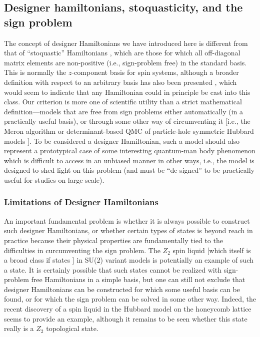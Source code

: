 \documentclass[range]{ar2e}
\begin{document}
\subsection{Designer hamiltonians, stoquasticity, and the sign problem}

The concept of designer Hamiltonians we have introduced here is different from that of ``stoquastic'' Hamiltonians \cite{Terhal08}, which are
those for which all off-diagonal matrix elements are non-positive (i.e., sign-problem free) in the standard basis.  This is normally the  $z$-component 
basis for spin systems, although a broader definition with respect to an arbitrary basis has also been presented \cite{Terhal09}, which would seem to 
indicate that any Hamiltonian could in principle be cast into this class. Our criterion is more one of scientific utility than a strict mathematical 
definition---models that are free from sign problems either automatically (in a practically useful basis), or through some 
other way of circumventing it [i.e., the Meron algorithm \cite{Chandrasekharan99} or determinant-based QMC of particle-hole symmetric Hubbard 
models \cite{White89,Assaad05,Assaad07}]. To be considered a designer Hamiltonian, such a model should also represent a prototypical case of 
some interesting quantum-man body phenomenon which is difficult to access in an unbiased manner in other ways, i.e., the model is designed to shed
light on this problem (and must be ``de-signed'' to be practically useful for studies on large scale).

\subsubsection{Limitations of Designer Hamiltonians}

An important fundamental problem is whether it is always possible to construct such designer Hamiltonians, or whether certain types of 
states is beyond reach in practice because their physical properties are fundamentally tied to the difficulties in curcumventing the sign problem. 
The $Z_2$ spin liquid [which itself is a broad class if states \cite{Wen03}] in SU($2$) variant models is potentially an example of such a state. 
It is certainly possible that such states cannot be realized with sign-problem free Hamiltonians in a simple basis, but one can still not exclude that 
designer Hamiltonians can be constructed for which some useful basis can be found, or for which the sign problem can be solved in some other way.
Indeed, the recent discovery of a spin liquid in the Hubbard model on the honeycomb lattice \cite{Meng10} seems to provide an example, although it 
remains to be seen whether this state really is a $Z_2$ topological state.
\end{document}
